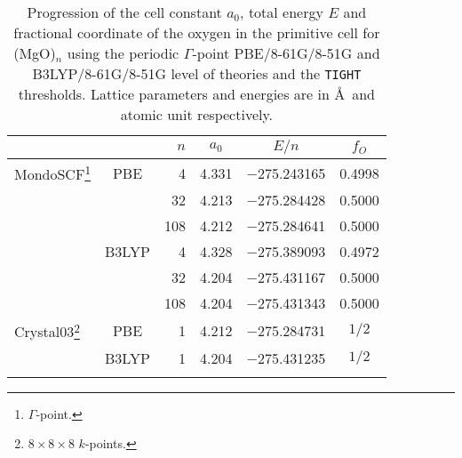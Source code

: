 \documentclass[prl,twocolumn,showpacs,twocolumngrid,superbib]{revtex4}
\begin{document}
\begin{table}[t]
  \centering
  \caption{\protect
    Progression of the cell constant $a_0$,
    total energy $E$ and fractional coordinate of the oxygen in the primitive cell
    for (MgO)$_n$ using the periodic $\Gamma$-point
    PBE/8-61G/8-51G and B3LYP/8-61G/8-51G level of theories and the {\tt TIGHT} thresholds.
    Lattice parameters and energies are in \AA~and atomic unit respectively.
  }\label{Tab:MgO}
  \begin{tabular}{lcrccc}
  \toprule
  & & $n$ & $a_0$ & $E/n$ & $f_O$ \\
  \hline
    {\sc MondoSCF}\footnote[1]{$\Gamma$-point.} 
    & PBE   &   4 & 4.331 & $-$275.243165 & 0.4998 \\%
    &       &  32 & 4.213 & $-$275.284428 & 0.5000 \\%
    &       & 108 & 4.212 & $-$275.284641 & 0.5000 \\%
    & B3LYP &   4 & 4.328 & $-$275.389093 & 0.4972 \\%
    &       &  32 & 4.204 & $-$275.431167 & 0.5000 \\%
    &       & 108 & 4.204 & $-$275.431343 & 0.5000 \\%
  \hline
    {\sc Crystal03}\footnote[2]{$8\times 8\times 8$ $k$-points.}
    & PBE   &   1 & 4.212 & $-$275.284731 & $1/2$ \\
    & B3LYP &   1 & 4.204 & $-$275.431235 & $1/2$ \\
  \botrule
  \end{tabular}
\end{table}
%
%
%
%
%
%
%
\end{document}
